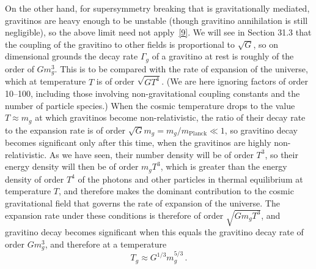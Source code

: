 On the other hand, for supersymmetry breaking that is gravitationally
mediated, gravitinos are heavy enough to be unstable (though gravitino
annihilation is still negligible), so the above limit need not
apply~\hyperref[ch28-ref-9]{[9]}. We will see in Section 31.3 that the
coupling of the gravitino to other fields is proportional to \(\sqrt{G}\),
so on dimensional grounds the decay rate \(\Gamma_g\) of a gravitino at
rest is roughly of the order of \(Gm_g^3\). This is to be compared with the
rate of expansion of the universe, which at temperature \(T\) is of order
\(\sqrt{GT^4}\). (We are here ignoring factors of order 10--100, including
those involving non-gravitational coupling constants and the number of
particle species.) When the cosmic temperature drops to the value
\(T\approx m_g\) at which gravitinos become non-relativistic, the ratio of
their decay rate to the expansion rate is of order
\(\sqrt{G}m_g=m_g/m_{\mathrm{Planck}}\ll1\), so gravitino decay becomes
significant only after this time, when the gravitinos are highly
non-relativistic. As we have seen, their number density will be of order
\(T^3\), so their energy density will then be of order \(m_gT^3\), which
is greater than the energy density of order \(T^4\) of the photons and
other particles in thermal equilibrium at temperature \(T\), and therefore
makes the dominant contribution to the cosmic gravitational field that
governs the rate of expansion of the universe. The expansion rate under
these conditions is therefore of order \(\sqrt{Gm_gT^3}\), and gravitino
decay becomes significant when this equals the gravitino decay rate of
order \(Gm_g^3\), and therefore at a temperature
\[
  T_g\approx G^{1/3}m_g^{5/3}\,.
\]

